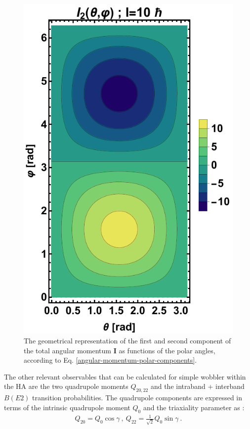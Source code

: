 \begin{figure}
    \includegraphics[scale=0.66]{Chapters/Figures/angular_components-TRM-2.pdf}
    \caption{The geometrical representation of the first and second component of the total angular momentum $\mathbf{I}$ as functions of the polar angles, according to Eq. \ref{angular-momentum-polar-components}.}
    \label{figs-angular-momentum-components-polar}
\end{figure}

The other relevant observables that can be calculated for simple wobbler within the HA are the two quadrupole moments $Q_{20,22}$ and the intraband + interband $B(E2)$ transition probabilities. The quadrupole components are expressed in terms of the intrinsic quadrupole moment $Q_0$ and the triaxiality parameter as \cite{shoji2006microscopic}:
\begin{align}
    Q_{20}=Q_0\cos\gamma\ ,\ Q_{22}=\frac{1}{\sqrt{2}}Q_0\sin\gamma\ .
    \label{quadrupole-components-q20-q22}
\end{align}

